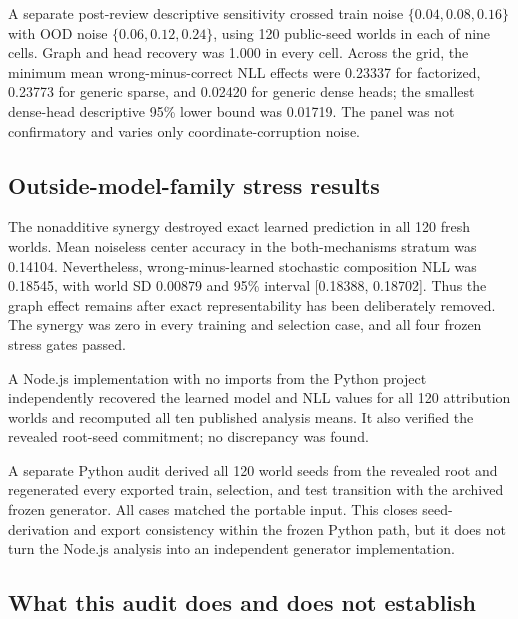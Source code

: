 A separate post-review descriptive sensitivity crossed train noise
\(\{0.04,0.08,0.16\}\) with OOD noise \(\{0.06,0.12,0.24\}\), using 120
public-seed worlds in each of nine cells.  Graph and head recovery was 1.000 in
every cell.  Across the grid, the minimum mean wrong-minus-correct NLL effects
were 0.23337 for factorized, 0.23773 for generic sparse, and 0.02420 for generic
dense heads; the smallest dense-head descriptive 95\% lower bound was 0.01719.
The panel was not confirmatory and varies only coordinate-corruption noise.

\subsection{Outside-model-family stress results}

The nonadditive synergy destroyed exact learned prediction in all 120 fresh
worlds.  Mean noiseless center accuracy in the both-mechanisms stratum was
0.14104.  Nevertheless, wrong-minus-learned stochastic composition NLL was
0.18545, with world SD 0.00879 and 95\% interval [0.18388, 0.18702].  Thus the
graph effect remains after exact representability has been deliberately
removed.  The synergy was zero in every training and selection case, and all
four frozen stress gates passed.

A Node.js implementation with no imports from the Python project independently
recovered the learned model and NLL values for all 120 attribution worlds and
recomputed all ten published analysis means.  It also verified the revealed
root-seed commitment; no discrepancy was found.

A separate Python audit derived all 120 world seeds from the revealed root and
regenerated every exported train, selection, and test transition with the
archived frozen generator.  All cases matched the portable input.  This closes
seed-derivation and export consistency within the frozen Python path, but it
does not turn the Node.js analysis into an independent generator implementation.

\subsection{What this audit does and does not establish}

